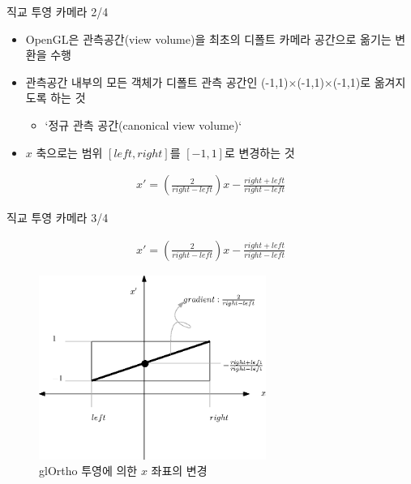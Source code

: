 \documentclass{beamer}
\begin{document}
\begin{frame}[fragile]{직교 투영 카메라 2/4}

\begin{itemize}
\item OpenGL은 관측공간(view volume)을 최초의 디폴트 카메라 공간으로 옮기는 변환을 수행
\item 관측공간 내부의 모든 객체가 디폴트 관측 공간인 (-1,1)$\times$(-1,1)$\times$(-1,1)로 옮겨지도록 하는 것
	\begin{itemize}
	\item ‘정규 관측 공간(canonical view volume)‘
	\end{itemize}
\item $x$ 축으로는 범위 $[left, right]$를 $[-1, 1]$로 변경하는 것
\end{itemize}

\begin{eqnarray}
x' = \left ( \frac{2}{right-left} \right ) x - \frac{right+left}{right-left} \nonumber
\end{eqnarray}

\end{frame}

\begin{frame}[fragile]{직교 투영 카메라 3/4}

\begin{eqnarray}
x' = \left ( \frac{2}{right-left} \right ) x - \frac{right+left}{right-left} \nonumber
\end{eqnarray}

\begin{figure}[h!]
  \centering
    \includegraphics[height=6cm]{OGL_camera/glOrthoXProjection.eps}
    \caption{glOrtho 투영에 의한 $x$ 좌표의 변경}
    \label{fig:OGL_camera:glOrthoXProjection}
\end{figure}

\end{frame}
\end{document}
